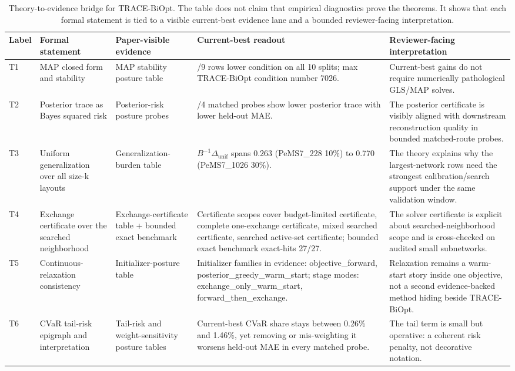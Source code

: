 \begin{table}[pos=htbp]
\centering
\caption{Theory-to-evidence bridge for TRACE-BiOpt. The table does not claim that empirical diagnostics prove the theorems. It shows that each formal statement is tied to a visible current-best evidence lane and a bounded reviewer-facing interpretation.}
\label{tab:trace-biopt-theory-bridge}
\footnotesize
\begin{tabularx}{\textwidth}{>{\raggedright\arraybackslash}p{}>{\raggedright\arraybackslash}p{}>{\raggedright\arraybackslash}p{}>{\raggedright\arraybackslash}p{}>{\raggedright\arraybackslash}X}
\toprule
Label & Formal statement & Paper-visible evidence & Current-best readout & Reviewer-facing interpretation \\
\midrule
T1 & MAP closed form and stability & MAP stability posture table & 6/9 rows lower condition on all 10 splits; max TRACE-BiOpt condition number 7026. & Current-best gains do not require numerically pathological GLS/MAP solves. \\
T2 & Posterior trace as Bayes squared risk & Posterior-risk posture probes & 4/4 matched probes show lower posterior trace with lower held-out MAE. & The posterior certificate is visibly aligned with downstream reconstruction quality in bounded matched-route probes. \\
T3 & Uniform generalization over all size-k layouts & Generalization-burden table & $B^{-1}\Delta_{\mathrm{unif}}$ spans 0.263 (PeMS7\_228 10\%) to 0.770 (PeMS7\_1026 30\%). & The theory explains why the largest-network rows need the strongest calibration/search support under the same validation window. \\
T4 & Exchange certificate over the searched neighborhood & Exchange-certificate table + bounded exact benchmark & Certificate scopes cover budget-limited certificate, complete one-exchange certificate, mixed searched certificate, searched active-set certificate; bounded exact benchmark exact-hits 27/27. & The solver certificate is explicit about searched-neighborhood scope and is cross-checked on audited small subnetworks. \\
T5 & Continuous-relaxation consistency & Initializer-posture table & Initializer families in evidence: objective\_forward, posterior\_greedy\_warm\_start; stage modes: exchange\_only\_warm\_start, forward\_then\_exchange. & Relaxation remains a warm-start story inside one objective, not a second evidence-backed method hiding beside TRACE-BiOpt. \\
T6 & CVaR tail-risk epigraph and interpretation & Tail-risk and weight-sensitivity posture tables & Current-best CVaR share stays between 0.26\% and 1.46\%, yet removing or mis-weighting it worsens held-out MAE in every matched probe. & The tail term is small but operative: a coherent risk penalty, not decorative notation. \\
\bottomrule
\end{tabularx}
\end{table}
